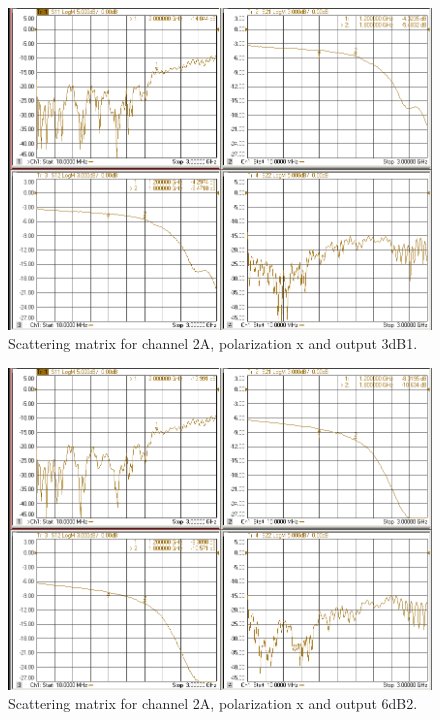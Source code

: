 \documentclass[12pt,a4paper,oneside]{article}
\begin{document}
\begin{figure}[H]
\centering
\includegraphics[width=0.9\linewidth]{VNA_results/2Ax_3dB1.png}
\caption{Scattering matrix for channel 2A, polarization x and output 3dB1.}
\label{fig:2Ax_3dB1}
\end{figure}


\begin{figure}[H]
\centering
\includegraphics[width=0.9\linewidth]{VNA_results/2Ax_6dB2.png}
\caption{Scattering matrix for channel 2A, polarization x and output 6dB2.}
\label{fig:2Ax_6dB2}
\end{figure}
\end{document}
